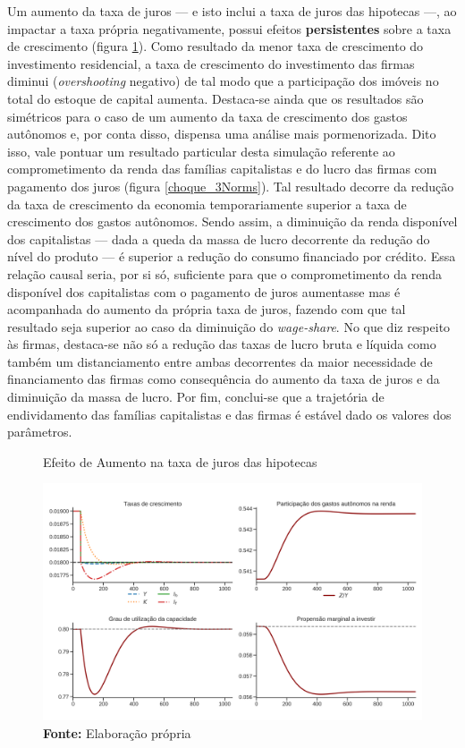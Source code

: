 Um aumento da taxa de juros  --- e isto inclui a taxa de juros das hipotecas ---, ao impactar a taxa própria negativamente, possui efeitos \textbf{persistentes} sobre a taxa de crescimento (figura \ref{choque_3}). Como resultado da menor taxa de crescimento do investimento residencial, a taxa de crescimento do investimento das firmas diminui (\textit{overshooting} negativo) de tal modo que a participação dos imóveis no total do estoque de capital aumenta. 
Destaca-se ainda que os resultados são simétricos para o caso de um aumento da taxa de crescimento dos gastos autônomos e, por conta disso, dispensa uma análise mais pormenorizada.
Dito isso, vale pontuar um resultado particular desta simulação referente ao comprometimento da renda das famílias capitalistas e do lucro das firmas com pagamento dos juros (figura \ref{choque_3Norms}). 
Tal resultado decorre da redução da taxa de crescimento da economia temporariamente superior a taxa de crescimento dos gastos autônomos.
Sendo assim, a diminuição da renda disponível dos capitalistas --- dada a queda da massa de lucro decorrente da redução do nível do produto --- é superior a redução do consumo financiado por crédito.
Essa relação causal seria, por si só, suficiente para que o comprometimento da renda disponível dos capitalistas com o pagamento de juros aumentasse mas é acompanhada do aumento da própria taxa de juros, fazendo com que tal resultado seja superior ao caso da diminuição do \textit{wage-share}.
No que diz respeito às firmas, destaca-se não só a redução das taxas de lucro bruta e líquida como também um distanciamento entre ambas decorrentes da maior necessidade de financiamento das firmas como consequência do aumento da taxa de juros e da diminuição da massa de lucro.
Por fim, conclui-se que a trajetória de endividamento das famílias capitalistas e das firmas é estável dado os valores dos parâmetros.


\begin{figure}[H]
	\centering
	\caption{Efeito de Aumento na taxa de juros das hipotecas}
	\label{choque_3}
	\includegraphics[width=\textwidth]{../../Modelo/Versoes/Shock_3.png}
	\caption*{\textbf{Fonte:} Elaboração própria}
\end{figure}


